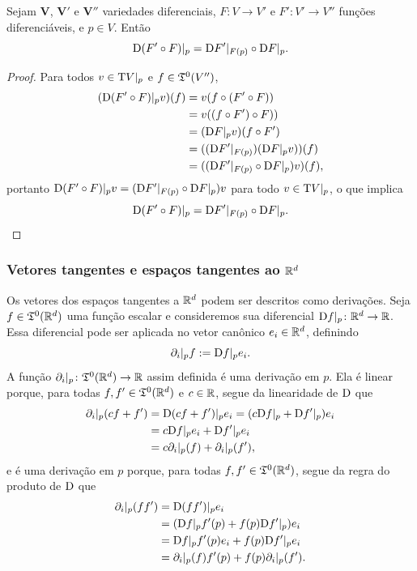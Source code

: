 \begin{proposition}
Sejam $\bm V$, $\bm V'$ e $\bm V''$ variedades diferenciais, $F\colon V \to V'$ e $F'\colon V' \to V''$ funções diferenciáveis, e $p \in V$. Então
	\begin{equation*}
	\mathrm{D}(F' \circ F)|_{p} = \mathrm{D} F'|_{F(p)} \circ \mathrm{D} F|_{p}.
	\end{equation*}
\end{proposition}
\begin{proof}
Para todos $v \in \mathrm{T} V|_p$ e $f \in \mathfrak{T}^0(V'')$,
	\begin{align*}
	(\mathrm{D}(F' \circ F)|_{p} v)(f) &= v(f \circ (F' \circ F)) \\
		&= v((f \circ F') \circ F)) \\
		&= (\mathrm{D} F|_p v)(f \circ F') \\
		&= ((\mathrm{D} F'|_{F(p)})(\mathrm{D} F|_{p} v))(f) \\
		&= ((\mathrm{D} F'|_{F(p)} \circ \mathrm{D} F|_{p}) v)(f),
	\end{align*}
portanto $\mathrm{D}(F' \circ F)|_{p}v = (\mathrm{D} F'|_{F(p)} \circ \mathrm{D} F|_{p})v$ para todo $v \in \mathrm{T} V|_p$, o que implica
	\begin{equation*}
	\mathrm{D}(F' \circ F)|_{p} = \mathrm{D} F'|_{F(p)} \circ \mathrm{D} F|_{p}. \qedhere
	\end{equation*}
\end{proof}

\subsubsection{Vetores tangentes e espaços tangentes ao \texorpdfstring{$\mathbb{R}^d$}{espaço real d-dimensional}}

Os vetores dos espaços tangentes a $\mathbb{R}^d$ podem ser descritos como derivações. Seja $f \in \mathfrak{T}^0(\mathbb{R}^d)$ uma função escalar e consideremos sua diferencial $\mathrm{D} f|_p\colon \mathbb{R}^d \to \mathbb{R}$. Essa diferencial pode ser aplicada no vetor canônico $e_i \in \mathbb{R}^d$, definindo
	\begin{equation*}
	\partial_i|_p f := \mathrm{D} f|_p e_i.
	\end{equation*}
A função $\partial_i|_p\colon \mathfrak{T}^0(\mathbb{R}^d) \to \mathbb{R}$ assim definida é uma derivação em $p$. Ela é linear porque, para todas $f,f' \in \mathfrak{T}^0(\mathbb{R}^d)$ e $c \in \mathbb{R}$, segue da linearidade de $\mathrm{D}$ que
	\begin{align*}
	\partial_i|_p(cf+f') &= \mathrm{D}(cf+f')|_p e_i = (c\mathrm{D} f|_p + \mathrm{D} f'|_p) e_i \\
		&= c\mathrm{D} f|_pe_i + \mathrm{D} f'|_p e_i \\
		&= c\partial_i|_p(f) + \partial_i|_p(f'),
	\end{align*}
e é uma derivação em $p$ porque, para todas $f,f' \in \mathfrak{T}^0(\mathbb{R}^d)$, segue da regra do produto de $\mathrm{D}$ que
	\begin{align*}
	\partial_i|_p (ff') &= \mathrm{D} (ff')|_p e_i \\
		&= (\mathrm{D} f|_p f'(p) + f(p) \mathrm{D} f'|_p) e_i \\
		&= \mathrm{D} f|_p f'(p)e_i + f(p) \mathrm{D} f'|_p e_i \\
		&= \partial_i|_p(f) f'(p) + f(p)\partial_i|_p(f').
	\end{align*}

